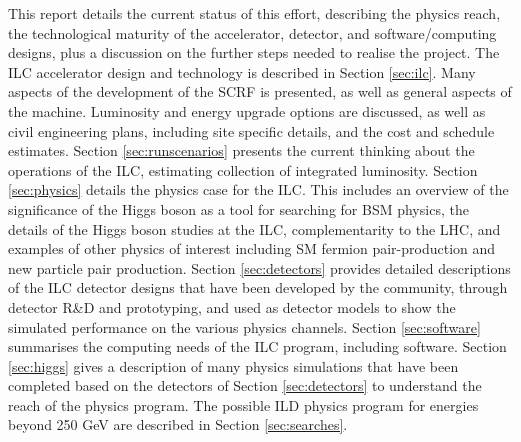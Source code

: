 This report details the current status of this effort, describing
the physics reach, the technological maturity of the accelerator,
detector, and software/computing designs,
plus a discussion on the further steps 
 needed to realise the project.
 The ILC accelerator design and technology is described
 in Section \ref{sec:ilc}.  Many aspects of the development of
 the SCRF is presented, as well as general aspects
 of the machine. Luminosity and energy upgrade options are
 discussed, as well as civil engineering plans, including site
 specific details, and the cost and schedule estimates.
 Section \ref{sec:runscenarios}  presents the current
 thinking about the operations of the ILC, estimating 
 collection of integrated luminosity.
 Section \ref{sec:physics} details the physics case for the ILC.
 This includes an overview of the significance of the Higgs boson 
 as a tool for searching for BSM physics,  
 the details of the Higgs boson studies at the ILC, 
 complementarity to the LHC, and examples of other physics
 of interest including SM fermion pair-production and
 new particle pair production.  Section \ref{sec:detectors}
 provides detailed descriptions of the ILC detector designs
 that have been developed by the community,
 through detector R\&D and prototyping, and used as detector
 models to show the simulated performance on the various
 physics channels. Section \ref{sec:software}
 summarises the computing needs of the ILC program,
 including software.    Section \ref{sec:higgs}
 gives a description of many physics simulations
 that have been completed based on the detectors of
 Section \ref{sec:detectors} to understand the
 reach of the physics program.
 The possible ILD physics program for energies
 beyond 250 GeV are described in
 Section \ref{sec:searches}.

